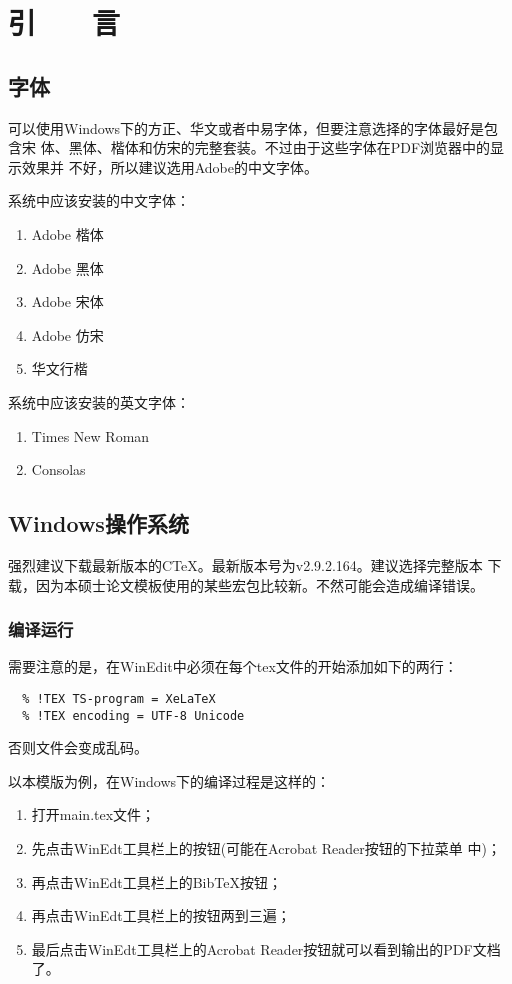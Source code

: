 ﻿%
\chapter*{\hfill 引　　言 \hfill}
\label{chap00}

\section{字体}

可以使用Windows下的方正、华文或者中易字体，但要注意选择的字体最好是包含宋
体、黑体、楷体和仿宋的完整套装。不过由于这些字体在PDF浏览器中的显示效果并
不好，所以建议选用Adobe的中文字体。

系统中应该安装的中文字体：
\begin{enumerate}
\item Adobe 楷体
\item Adobe 黑体
\item Adobe 宋体
\item Adobe 仿宋
\item 华文行楷
\end{enumerate}

系统中应该安装的英文字体：
\begin{enumerate}
\item Times New Roman
\item Consolas
\end{enumerate}

\section{Windows操作系统}

强烈建议下载最新版本的C\TeX{}。最新版本号为v2.9.2.164。建议选择完整版本
下载，因为本硕士论文模板使用的某些宏包比较新。不然可能会造成编译错误。

\subsection{编译运行}

需要注意的是，在WinEdit中必须在每个tex文件的开始添加如下的两行：
\begin{lstlisting}
  % !TEX TS-program = XeLaTeX
  % !TEX encoding = UTF-8 Unicode
\end{lstlisting}
否则文件会变成乱码。

以本模版为例，在Windows下的编译过程是这样的：
\begin{enumerate}
\item 打开main.tex文件；
\item 先点击WinEdt工具栏上的\XeLaTeX{}按钮(可能在Acrobat Reader按钮的下拉菜单
  中)；
\item 再点击WinEdt工具栏上的Bib\TeX{}按钮；
\item 再点击WinEdt工具栏上的\XeLaTeX{}按钮两到三遍；
\item 最后点击WinEdt工具栏上的Acrobat Reader按钮就可以看到输出的PDF文档了。
\end{enumerate}


